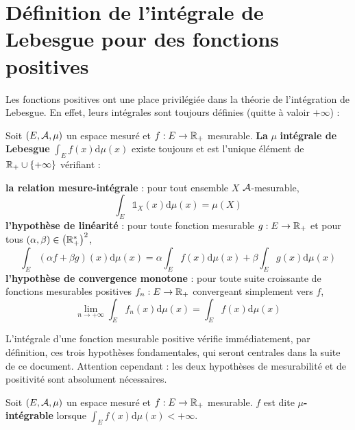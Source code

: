 \documentclass[../integ-proba.tex]{subfiles}
\begin{document}
  \section{Définition de l'intégrale de Lebesgue pour des fonctions positives}
  \label{sec:defintpos}
  Les fonctions positives ont une place privilégiée dans la théorie de l'intégration de Lebesgue.
  En effet, leurs intégrales sont toujours définies (quitte à valoir $+\infty$) :

  \begin{defi}
    Soit $\left(E,\mathcal{A},\mu\right)$ un espace mesuré et $f:E\rightarrow\mathbb{R}_+$ mesurable.
    \textbf{La} $\mu $\textbf{ intégrale de Lebesgue } $\displaystyle\int_E f(x)\text{d}\mu(x)$ existe toujours et est l'unique élément de $\mathbb{R}_+\cup\{+\infty\}$ vérifiant :
    \begin{itemize}
      \itemb \textbf{la relation mesure-intégrale} : pour tout ensemble $X$ $\mathcal{A}$-mesurable,
      \begin{displaymath}
        \int_E\mathds{1}_X(x)\text{d}\mu(x)=\mu(X)
      \end{displaymath}
      \itemb \textbf{l'hypothèse de linéarité} : pour toute fonction mesurable $g:E\rightarrow\mathbb{R}_+$ et pour tous $\left(\alpha,\beta\right) \in \left(\mathbb{R}_+^*\right)^2$,
      \begin{displaymath}
        \int_E (\alpha f + \beta g)(x) \text{d}\mu(x)=\alpha\int_E f(x)\text{d}\mu(x) + \beta\int_E g(x)\text{d}\mu(x)
      \end{displaymath}
      \itemb \textbf{l'hypothèse de convergence monotone} : pour toute suite croissante de fonctions mesurables positives $f_n:E\rightarrow\mathbb{R}_+$ convergeant simplement vers $f$,
      \begin{displaymath}
        \lim_{n\rightarrow+\infty}\int_E f_n(x)\text{d}\mu(x)=\int_E f(x)\text{d}\mu(x)
      \end{displaymath}
    \end{itemize}
  \end{defi}

  \begin{rem}
    L'intégrale d'une fonction mesurable positive vérifie immédiatement, par définition, ces trois hypothèses fondamentales, qui seront centrales dans la suite de ce document.
    Attention cependant : les deux hypothèses de mesurabilité et de positivité sont absolument nécessaires.
  \end{rem}

  \begin{defi}
    Soit $\left(E,\mathcal{A},\mu\right)$ un espace mesuré et $f:E\rightarrow\mathbb{R}_+$ mesurable.
    $f$ est dite $\mu$\textbf{-intégrable} lorsque $\displaystyle\int_E f(x)\text{d}\mu(x) < +\infty$.
  \end{defi}
\end{document}
